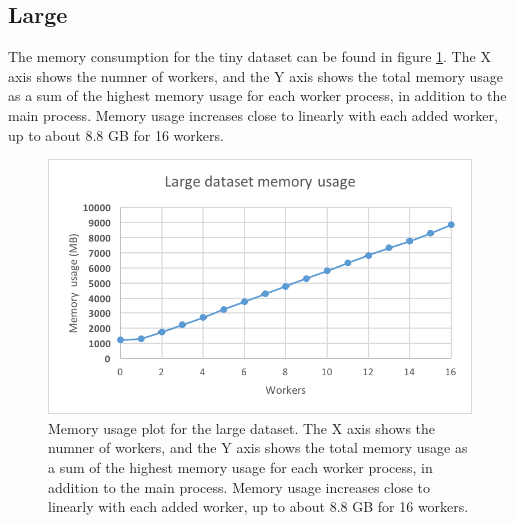 \subsection{Large}
The memory consumption for the tiny dataset can be found in figure \ref{fig:dataset_4_memory}.
The X axis shows the numner of workers, and the Y axis shows the total memory usage as
a sum of the highest memory usage for each worker process, in addition to the main process. Memory usage increases close to linearly with each added worker,
up to about 8.8 GB for 16 workers.
\begin{figure}[ht]
  \centering
  \includegraphics[width=120mm]{figures/dataset_4/dataset_4_memory.png}
  \caption[Memory usage plot for the large dataset.]{Memory usage plot for the large dataset. The X axis shows the numner of workers, and the Y axis shows the total memory usage as
  a sum of the highest memory usage for each worker process, in addition to the main process. Memory usage increases close to linearly with each added worker,
  up to about 8.8 GB for 16 workers.}
  \label{fig:dataset_4_memory}
\end{figure}

